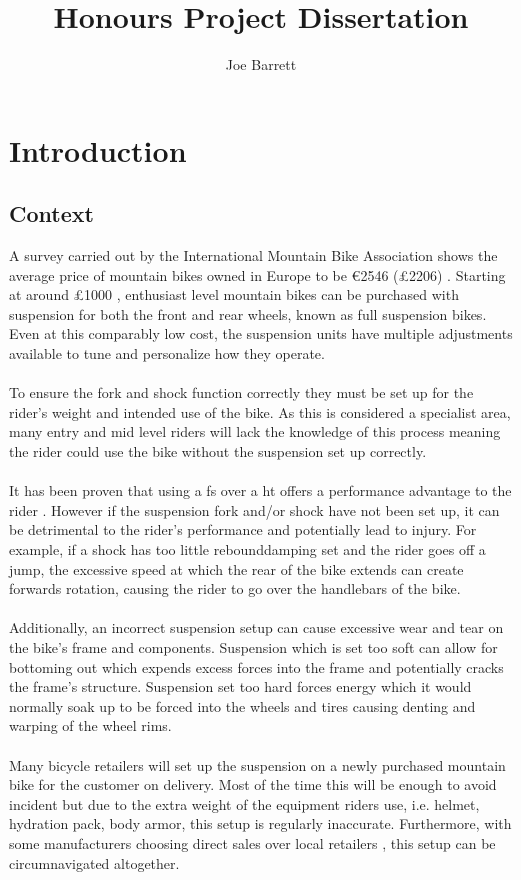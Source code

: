 \documentclass[a4paper, 12pt, hidelinks]{article}
\title{Honours Project Dissertation}
\author{Joe Barrett}
\begin{document}
	
	\begin{abstract}
		\blindtext
	\end{abstract}
	\newpage
	\tableofcontents
	\newpage
	\listoftables
	\newpage
	\listoffigures
	\newpage
	\section{Introduction}
	\subsection{Context}
	A survey carried out by the International Mountain Bike Association shows the average price of mountain bikes owned in Europe to be \euro2546 (\pounds2206) \citep{imbasurv}. Starting at around \pounds1000 \citep{giantstance}, enthusiast level mountain bikes can be purchased with suspension for both the front and rear wheels, known as full suspension bikes. Even at this comparably low cost, the suspension units have multiple adjustments available to tune and personalize how they operate.
	\\\\
	To ensure the \gls{fork} and \gls{shock} function correctly they must be set up for the rider's weight and intended use of the bike. As this is considered a specialist area, many entry and mid level riders will lack the knowledge of this process meaning the rider could use the bike without the suspension set up correctly.
	\\\\
	It has been proven that using a \gls{fs} over a \gls{ht} offers a performance advantage to the rider \citep{fullsusperf}. However if the suspension fork and/or shock have not been set up, it can be detrimental to the rider's performance and potentially lead to injury. For example, if a shock has too little \gls{rebounddamping} set and the rider goes off a jump, the excessive speed at which the rear of the bike extends can create forwards rotation, causing the rider to go over the handlebars of the bike.
	\\\\
	Additionally, an incorrect suspension setup can cause excessive wear and tear on the bike's frame and components. Suspension which is set too soft can allow for bottoming out which expends excess forces into the frame and potentially cracks the frame's structure. Suspension set too hard forces energy which it would normally soak up to be forced into the wheels and tires causing denting and warping of the wheel rims.
	\\\\
	Many bicycle retailers will set up the suspension on a newly purchased mountain bike for the customer on delivery. Most of the time this will be enough to avoid incident but due to the extra weight of the equipment riders use, i.e. helmet, hydration pack, body armor, this setup is regularly inaccurate. Furthermore, with some manufacturers choosing direct sales over local retailers \citep{roseonline, ytonline}, this setup can be circumnavigated altogether.
	\newpage
\end{document}
